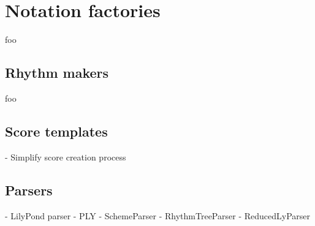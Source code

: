 \section{Notation factories}

foo

\subsection{Rhythm makers}

foo

\subsection{Score templates}

\begin{markdown}
-   Simplify score creation process
\end{markdown}

\subsection{Parsers}

\begin{markdown}
-   LilyPond parser
-   PLY
-   SchemeParser
-   RhythmTreeParser
-   ReducedLyParser
\end{markdown}
